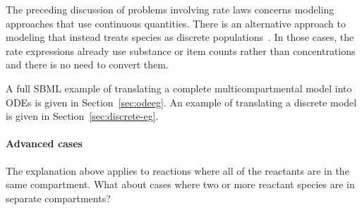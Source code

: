 The preceding discussion of problems involving rate laws concerns
modeling approaches that use continuous quantities.  There is an
alternative approach to modeling that instead treats species as
discrete populations~\citep{wilkinson_2006}.  In those cases, the
rate expressions already use substance or item counts rather than
concentrations and there is no need to convert them.

A full SBML example of translating a complete multicompartmental
model into ODEs is given in Section~\ref{sec:odeeg}.  An example
of translating a discrete model is given in
Section~\ref{sec:discrete-eg}.


\paragraph{Advanced cases}

The explanation above applies to reactions where all of the
reactants are in the same compartment.  What about cases where two
or more reactant species are in separate compartments?

